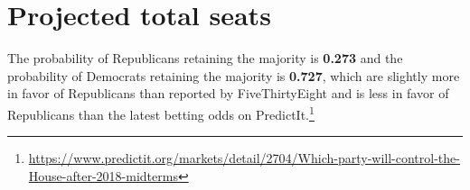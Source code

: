 \documentclass[12pt]{article}
\begin{document}
\section{Projected total seats}
\label{sec:agg_res}

The probability of Republicans retaining the majority is \textbf{0.273} and the probability of Democrats retaining the majority is \textbf{0.727}, which are slightly more in favor of Republicans than reported by FiveThirtyEight and is less in favor of Republicans than the latest betting odds on PredictIt.\footnote{\url{https://www.predictit.org/markets/detail/2704/Which-party-will-control-the-House-after-2018-midterms}}



\end{document}
